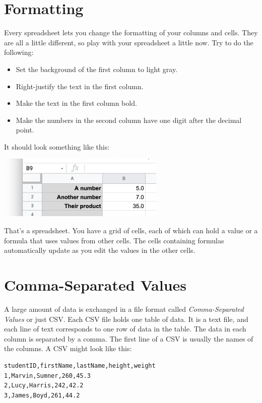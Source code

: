 \section{Formatting}

Every spreadsheet lets you change the formatting of your columns and cells. They are all a little different, so play with your spreadsheet a little now. Try to do the following:
\begin{itemize}
\item Set the background of the first column to light gray.
\item Right-justify the text in the first column.
\item Make the text in the first column bold.
\item Make the numbers in the second column have one digit after the decimal point.
\end{itemize}

It should look something like this:

\includegraphics[width=0.6\textwidth]{FirstFormatting.png}

That's a spreadsheet. You have a grid of cells, each of which can hold a
value or a formula that uses values from other cells. The cells containing
formulas automatically update as you edit the values in the other
cells.

\section{Comma-Separated Values}

A large amount of data is exchanged in a file format called
\textit{Comma-Separated Values} or just CSV. Each CSV file holds one
table of data. It is a text file, and each line of text corresponds to
one row of data in the table. The data in each column is separated by
a comma. The first line of a CSV is usually the names of the
columns. A CSV might look like this:

\begin{Verbatim}
studentID,firstName,lastName,height,weight
1,Marvin,Sumner,260,45.3
2,Lucy,Harris,242,42.2
3,James,Boyd,261,44.2
\end{Verbatim}

